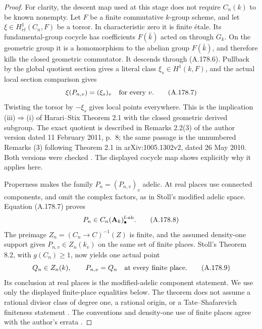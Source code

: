 \begin{proof}
For clarity, the descent map used at this stage does not require
\(C_n(k)\) to be known nonempty.  Let \(F\) be a finite
commutative \(k\)-group scheme, and let
\(\xi\in H^1_{\acute et}(C_n,F)\) be a torsor.  In characteristic
zero it is finite étale.  Its fundamental-group cocycle has
coefficients \(F(\bar k)\) acted on through \(G_k\).
On the geometric group it is a homomorphism to the abelian
group \(F(\bar k)\), and therefore kills the closed geometric
commutator.  It descends through (A.178.6).  Pullback by the
global quotient section gives a literal class
\(\xi_s\in H^1(k,F)\), and the actual local section comparison
gives
\[
                       \xi(P_{n,v})=(\xi_s)_v
                                      \quad\hbox{for every }v.
\tag{A.178.7}
\]
Twisting the torsor by \(-\xi_s\) gives local points everywhere.
This is the implication (iii)\(\Rightarrow\)(i) of
Harari--Stix Theorem 2.1 with the closed geometric derived
subgroup.  The exact quotient is described in Remarks 2.2(3)
of the author version dated 11 February 2011, p.~8;
the same passage is the unnumbered Remarks (3) following
Theorem 2.1 in arXiv:1005.1302v2, dated 26 May 2010.
Both versions were checked
\cite[Theorem 2.1, Remarks 2.2(3), and Corollary 3.1
in the 2011 author version]{AgentHarariStix}.
The displayed cocycle map shows explicitly why it applies here.

Properness makes the family \(P_n=(P_{n,v})_v\) adelic.  At real
places use connected components, and omit the complex factors,
as in Stoll's modified adelic space.  Equation (A.178.7) proves
\[
                    P_n\in C_n(\mathbf A_k)^{\rm f\text{-}ab}_\bullet.
\tag{A.178.8}
\]
The preimage \(Z_n=(C_n\to C)^{-1}(Z)\) is finite, and the
assumed density-one support gives \(P_{n,v}\in Z_n(k_v)\) on
the same set of finite places.  Stoll's Theorem 8.2, with
\(g(C_n)\ge1\), now yields one actual point
\[
               Q_n\in Z_n(k),\qquad
               P_{n,v}=Q_n\quad\hbox{at every finite place}.
\tag{A.178.9}
\]
Its conclusion at real places is the modified-adelic component
statement.  We use only the displayed finite-place equalities
below.  The theorem does not assume a rational divisor class
of degree one, a rational origin, or a Tate--Shafarevich
finiteness statement
\cite[Theorem 8.2, p.~36 of the author version]{LegStoll2007}.
The conventions and density-one use of finite places agree
with the author's errata
\cite[Sections 1 and 3]{LegStollErrata2017}.


\end{proof}
